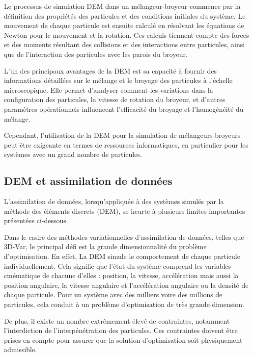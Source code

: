 Le processus de simulation DEM dans un mélangeur-broyeur commence par la définition des propriétés des particules et des conditions initiales du système. Le mouvement de chaque particule est ensuite calculé en résolvant les équations de Newton pour le mouvement et la rotation. Ces calculs tiennent compte des forces et des moments résultant des collisions et des interactions entre particules, ainsi que de l'interaction des particules avec les parois du broyeur.

L'un des principaux avantages de la DEM est sa capacité à fournir des informations détaillées sur le mélange et le broyage des particules à l'échelle microscopique. Elle permet d'analyser comment les variations dans la configuration des particules, la vitesse de rotation du broyeur, et d'autres paramètres opérationnels influencent l'efficacité du broyage et l'homogénéité du mélange.

Cependant, l'utilisation de la DEM pour la simulation de mélangeurs-broyeurs peut être exigeante en termes de ressources informatiques, en particulier pour les systèmes avec un grand nombre de particules.

\subsection{DEM et assimilation de données}

L'assimilation de données, lorsqu'appliquée à des systèmes simulés par la méthode des éléments discrets (DEM), se heurte à plusieurs limites importantes présentées ci-dessous.

Dans le cadre des méthodes variationnelles d'assimilation de données, telles que 3D-Var, le principal défi est la grande dimensionnalité du problème d'optimisation.
En effet, La DEM simule le comportement de chaque particule individuellement. Cela signifie que l'état du système comprend les variables cinématique de chacune d'elles : position, la vitesse, accélération mais aussi la position angulaire, la vitesse angulaire et l'accélération angulaire ou la densité de chaque particule. Pour un système avec des milliers voire des millions de particules, cela conduit à un problème d'optimisation de très grande dimension.

De plus, il existe un nombre extrêmement élevé de contraintes, notamment l'interdiction de l'interpénétration des particules. Ces contraintes doivent être prises en compte pour assurer que la solution d'optimisation soit physiquement admissible.

